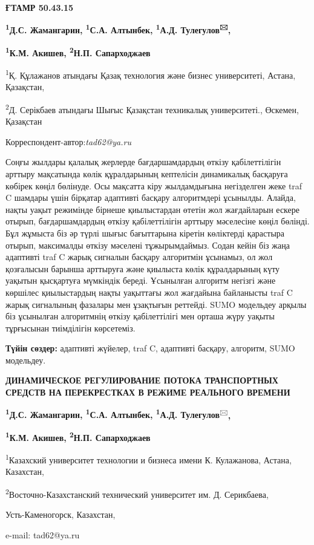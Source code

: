 \newpage
{\bfseries ҒТАМР 50.43.15}


\begin{center}

{\bfseries \textsuperscript{1}Д.С. Жамангарин, \textsuperscript{1}С.А.
Алтынбек, \textsuperscript{1}А.Д. Тулегулов\textsuperscript{🖂},}

{\bfseries \textsuperscript{1}К.М. Акишев, \textsuperscript{2}Н.П.
Сапарходжаев}

\textsuperscript{1}Қ. Құлажанов атындағы Қазақ технология және бизнес
университеті, Астана, Қазақстан,

\textsuperscript{2}Д. Серікбаев атындағы Шығыс Қазақстан техникалық
университеті., Өскемен, Қазақстан

Корреспондент-автор:\emph{tad62@ya.ru}
\end{center}

Соңғы жылдары қалалық жерлерде бағдаршамдардың өткізу қабілеттілігін
арттыру мақсатында көлік құралдарының кептелісін динамикалық басқаруға
көбірек көңіл бөлінуде. Осы мақсатта кіру жылдамдығына негізделген жеке
traf C шамдары үшін бірқатар адаптивті басқару алгоритмдері ұсынылды.
Алайда, нақты уақыт режимінде бірнеше қиылыстардан өтетін жол
жағдайларын ескере отырып, бағдаршамдардың өткізу қабілеттілігін арттыру
мәселесіне көңіл бөлінді. Бұл жұмыста біз әр түрлі шығыс бағыттарына
кіретін көліктерді қарастыра отырып, максималды өткізу мәселені
тұжырымдаймыз. Содан кейін біз жаңа адаптивті traf C жарық сигналын
басқару алгоритмін ұсынамыз, ол жол қозғалысын барынша арттыруға және
қиылыста көлік құралдарының күту уақытын қысқартуға мүмкіндік береді.
Ұсынылған алгоритм негізгі және көршілес қиылыстардың нақты уақыттағы
жол жағдайына байланысты traf C жарық сигналының фазалары мен ұзақтығын
реттейді. SUMO модельдеу арқылы біз ұсынылған алгоритмнің өткізу
қабілеттілігі мен орташа жүру уақыты тұрғысынан тиімділігін көрсетеміз.

{\bfseries Түйін сөздер:} адаптивті жүйелер, traf C, адаптивті басқару,
алгоритм, SUMO модельдеу.

\begin{center}

{\large\bfseries ДИНАМИЧЕСКОЕ РЕГУЛИРОВАНИЕ ПОТОКА ТРАНСПОРТНЫХ СРЕДСТВ НА
ПЕРЕКРЕСТКАХ В РЕЖИМЕ РЕАЛЬНОГО ВРЕМЕНИ}

{\bfseries \textsuperscript{1}Д.С. Жамангарин, \textsuperscript{1}С.А.
Алтынбек, \textsuperscript{1}А.Д.
Тулегулов}\textsuperscript{🖂}{\bfseries ,}

{\bfseries \textsuperscript{1}К.М. Акишев, \textsuperscript{2}Н.П.
Сапарходжаев}

\textsuperscript{1}Казахский университет технологии и бизнеса имени К.
Кулажанова, Астана, Казахстан,

\textsuperscript{2}Восточно-Казахстанский технический университет им. Д.
Серикбаева,

Усть-Каменогорск, Казахстан,

e-mail: tad62@ya.ru
\end{center}

